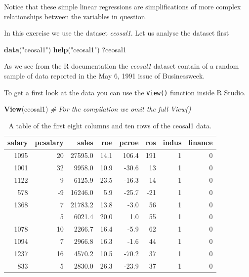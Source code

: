\documentclass[]{book}
\newenvironment{Shaded}{\begin{snugshade}}{\end{snugshade}}
\newcommand{\CommentTok}[1]{\textcolor[rgb]{0.56,0.35,0.01}{\textit{#1}}}
\newcommand{\KeywordTok}[1]{\textcolor[rgb]{0.13,0.29,0.53}{\textbf{#1}}}
\newcommand{\NormalTok}[1]{#1}
\newcommand{\StringTok}[1]{\textcolor[rgb]{0.31,0.60,0.02}{#1}}
\begin{document}
Notice that these simple linear regressions are simplifications of more
complex relationships between the variables in question.

In this exercise we use the dataset \emph{ceosal1}. Let us analyse the
dataset first

\begin{Shaded}
\begin{Highlighting}[]
\KeywordTok{data}\NormalTok{(}\StringTok{"ceosal1"}\NormalTok{)}
\KeywordTok{help}\NormalTok{(}\StringTok{"ceosal1"}\NormalTok{)}
\NormalTok{?ceosal1}
\end{Highlighting}
\end{Shaded}

As we see from the R documentation the \emph{ceosal1} dataset contain of
a random sample of data reported in the May 6, 1991 issue of
Businessweek.

To get a first look at the data you can use the \texttt{View()} function
inside R Studio.

\begin{Shaded}
\begin{Highlighting}[]
\KeywordTok{View}\NormalTok{(ceosal1) }\CommentTok{# For the compilation we omit the full View()}
\end{Highlighting}
\end{Shaded}

\begin{table}

\caption{\label{tab:unnamed-chunk-6}A table of the first eight columns and ten rows of the ceosal1 data.}
\centering
\begin{tabular}[t]{rrrrrrrr}
\toprule
salary & pcsalary & sales & roe & pcroe & ros & indus & finance\\
\midrule
1095 & 20 & 27595.0 & 14.1 & 106.4 & 191 & 1 & 0\\
1001 & 32 & 9958.0 & 10.9 & -30.6 & 13 & 1 & 0\\
1122 & 9 & 6125.9 & 23.5 & -16.3 & 14 & 1 & 0\\
578 & -9 & 16246.0 & 5.9 & -25.7 & -21 & 1 & 0\\
1368 & 7 & 21783.2 & 13.8 & -3.0 & 56 & 1 & 0\\
\addlinespace
1145 & 5 & 6021.4 & 20.0 & 1.0 & 55 & 1 & 0\\
1078 & 10 & 2266.7 & 16.4 & -5.9 & 62 & 1 & 0\\
1094 & 7 & 2966.8 & 16.3 & -1.6 & 44 & 1 & 0\\
1237 & 16 & 4570.2 & 10.5 & -70.2 & 37 & 1 & 0\\
833 & 5 & 2830.0 & 26.3 & -23.9 & 37 & 1 & 0\\
\bottomrule
\end{tabular}
\end{table}
\end{document}
